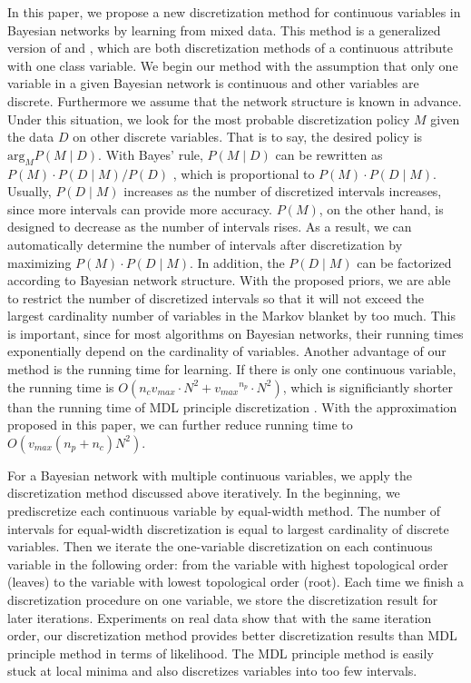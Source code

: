In this paper, we propose a new discretization method for continuous variables in Bayesian networks by learning from mixed data. This method is a generalized version of  \citet{Boulle_2006} and \citet{Lustgarten_2011}, which are both discretization methods of a continuous attribute with one class variable. We begin our method with the assumption that only one variable in a given Bayesian network is continuous and other variables are discrete. Furthermore we assume that the network structure is known in advance. Under this situation, we look for the most probable discretization policy $M$ given the data $D$ on other discrete variables. That is to say, the desired policy is $\textrm{arg}_M P(M \mid D)$. With Bayes' rule, $P(M \mid D) $ can be rewritten as $P(M) \cdot P(D \mid M) / P(D)$ , which is proportional to $P(M)\cdot P(D \mid M)$. Usually, $P(D \mid M)$ increases as the number of discretized intervals increases, since more intervals can provide more accuracy. $P(M)$, on the other hand, is designed to decrease as the number of intervals rises. As a result, we can automatically determine the number of intervals after discretization by maximizing  $P(M)\cdot P(D \mid M)$. In addition, the $P(D \mid M)$ can be factorized according to Bayesian network structure. With the proposed priors, we are able to restrict the number of discretized intervals so that it will not exceed the largest cardinality number of variables in the Markov blanket by too much. This is important, since for most algorithms on Bayesian networks, their running times exponentially depend on the cardinality of variables. Another advantage of our method is the running time for learning. If there is only one continuous variable, the running time is $O(n_c  {v_{max}} \cdot N^2 + {v_{max}}^{n_p} \cdot N^2)$, which is significiantly shorter than the running time of MDL principle discretization \citep{Friedman_1996}. With the approximation proposed in this paper, we can further reduce running time to $O({v_{max}}(n_p+n_c)N^2)$.

For a Bayesian network with multiple continuous variables, we apply the discretization method discussed above iteratively. In the beginning, we prediscretize each continuous variable by equal-width method. The number of intervals for equal-width discretization is equal to largest cardinality of discrete variables. Then we iterate the one-variable discretization on each continuous variable in the following order: from the variable with highest topological order (leaves) to the variable with lowest topological order (root). Each time we finish a discretization procedure on one variable, we store the discretization result for later iterations. Experiments on real data show that with the same iteration order, our discretization method provides better discretization results than MDL principle method in terms of likelihood. The MDL principle method is easily stuck at local minima and also discretizes variables into too few intervals.


